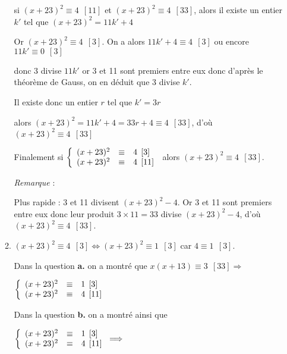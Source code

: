 \documentclass[11pt,a4paper,answers,fancyhdr]{exam}
\newcommand{\equi}{\Longleftrightarrow}
\newcommand{\imp}{\Longrightarrow}
\begin{document}
\begin{enumerate}
\begin{enumerate}
\begin{solution}
si $(x + 23)^2 \equiv 4\:\: [11]$ et $(x + 23)^2\equiv 4 \:\: [33]$, alors il existe un entier $k'$ tel que $(x+23)^2=11k'+4$

Or $(x + 23)^2 \equiv 4\:\: [3]$. 
On a alors $11k'+ 4 \equiv 4\:\: [3]  $ ou encore $11k' \equiv 0\:\: [3]$

donc 3 divise $11k'$ or 3 et  11 sont premiers entre eux
donc d'après le théorème de Gauss, 
on en déduit que 3 divise $k'$.

Il existe donc un entier $r$ tel que $k'=3r$

alors $(x + 23)^2 = 11k' + 4 = 33r + 4\equiv 4\:\: [33]$, d'où $(x + 23)^2 \equiv 4\:\: [33]$

Finalement si  $\left\{\begin{array}{l c l}
(x + 23)^2 &\equiv &4\:\: [3]\\ 
(x + 23)^2 &\equiv &4 \:\: [11]
\end{array}\right.$ alors $(x + 23)^2 \equiv 4\:\: [33]$.
\end{solution}

\emph{Remarque} :

Plus rapide : 3 et 11 divisent $(x + 23)^2 - 4$. Or 3 et 11 sont premiers entre eux donc leur produit $ 3 \times 11 = 33$ divise $(x + 23)^2 - 4$, d'où $(x + 23)^2 \equiv 4\:\: [33]$.

		\item %

\begin{solution}
$(x + 23)^2 \equiv 4\:\: [3] \equi (x + 23)^2 \equiv 1\:\: [3] $ car $4 \equiv 1\:\:[3]$.

Dans la question \textbf{a.} on a montré que $x(x + 13) \equiv 3\:\: [33] \imp  $

$\left\{\begin{array}{l c l}
(x + 23)^2 &\equiv&1 \:\: [3]\\
(x + 23)^2 &\equiv& 4 \:\: [11]
\end{array}\right.$

Dans la question \textbf{b.} on a montré ainsi que 

$ \left\{\begin{array}{l c l}
(x + 23)^2 &\equiv&1 \:\: [3]\\
(x + 23)^2 &\equiv& 4 \:\: [11]
\end{array}\right.\imp$


\end{solution}
\end{enumerate}
\end{enumerate}
\end{document}
